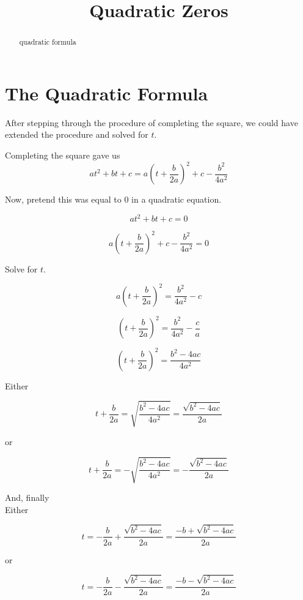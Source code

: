 \documentclass{ximera}
\title{Quadratic Zeros}
\begin{document}
\begin{abstract}
quadratic formula
\end{abstract}
\maketitle







\section{The Quadratic Formula}


After stepping through the procedure of completing the square, we could have extended the procedure and solved for $t$.


Completing the square gave us 
\[ a t^2 + b t + c = a \left(t + \frac{b}{2 a} \right)^2 + c - \frac{b^2}{4 a^2} \]


Now, pretend this was equal to $0$ in a quadratic equation.


\[ a t^2 + b t + c = 0 \]

\[ a(t + \frac{b}{2 a})^2 + c - \frac{b^2}{4 a^2}  = 0\]

Solve for $t$.


\[ a \left(t + \frac{b}{2 a} \right)^2  = \frac{b^2}{4 a^2} - c\]

\[ \left(t + \frac{b}{2 a} \right)^2  = \frac{b^2}{4 a^2} - \frac{c}{a}\]

\[ \left(t + \frac{b}{2 a} \right)^2  = \frac{b^2 - 4 a c}{4 a^2} \]



Either 


\[ t + \frac{b}{2 a}  = \sqrt{\frac{b^2 - 4 a c}{4 a^2}}  = \frac{\sqrt{b^2 - 4 a c}}{2a}   \]

or


\[ t + \frac{b}{2 a}  = -\sqrt{\frac{b^2 - 4 a c}{4 a^2}} = -\frac{\sqrt{b^2 - 4 a c}}{2a}    \]


And, finally \\



Either 


\[ t   = - \frac{b}{2 a} + \frac{\sqrt{b^2 - 4 a c}}{2a}  = \frac{-b + \sqrt{b^2 - 4 a c}}{2a}      \]

or


\[ t  = - \frac{b}{2 a}  -\frac{\sqrt{b^2 - 4 a c}}{2a} =    \frac{-b - \sqrt{b^2 - 4 a c}}{2a}      \]
\end{document}
